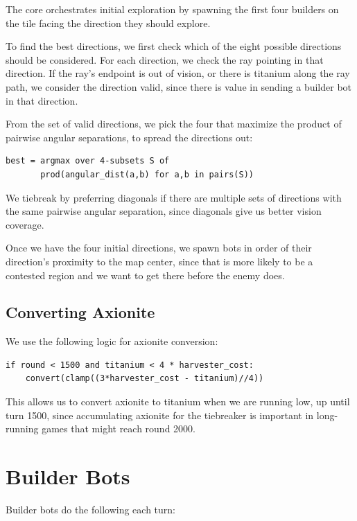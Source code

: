 \documentclass[10pt,sigconf,nonacm]{acmart}
\begin{document}
The core orchestrates initial exploration by spawning the first four builders on the tile facing the direction they should explore.

To find the best directions, we first check which of the eight possible directions should be considered. For each direction, we check the ray pointing in that direction. If the ray's endpoint is out of vision, or there is titanium along the ray path, we consider the direction valid, since there is value in sending a builder bot in that direction.

From the set of valid directions, we pick the four that maximize the product of pairwise angular separations, to spread the directions out:
\vfill\null

\begin{lstlisting}
best = argmax over 4-subsets S of
       prod(angular_dist(a,b) for a,b in pairs(S))
\end{lstlisting}

We tiebreak by preferring diagonals if there are multiple sets of directions with the same pairwise angular separation, since diagonals give us better vision coverage.

Once we have the four initial directions, we spawn bots in order of their direction's proximity to the map center, since that is more likely to be a contested region and we want to get there before the enemy does.

\subsection{Converting Axionite}

We use the following logic for axionite conversion:

\begin{lstlisting}
if round < 1500 and titanium < 4 * harvester_cost:
    convert(clamp((3*harvester_cost - titanium)//4))
\end{lstlisting}

This allows us to convert axionite to titanium when we are running low, up until turn 1500, since accumulating axionite for the tiebreaker is important in long-running games that might reach round 2000.

\section{Builder Bots}

Builder bots do the following each turn:
\end{document}
